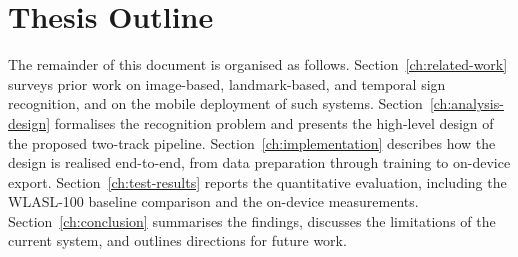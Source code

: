 \section{Thesis Outline}
\label{sec:intro-outline}

The remainder of this document is organised as follows.
Section~\ref{ch:related-work} surveys prior work on image-based,
landmark-based, and temporal sign recognition, and on the mobile
deployment of such systems.
Section~\ref{ch:analysis-design} formalises the recognition problem
and presents the high-level design of the proposed two-track
pipeline.
Section~\ref{ch:implementation} describes how the design is realised
end-to-end, from data preparation through training to on-device
export. Section~\ref{ch:test-results} reports the quantitative
evaluation, including the WLASL-100 baseline comparison and the
on-device measurements. Section~\ref{ch:conclusion} summarises the
findings, discusses the limitations of the current system, and
outlines directions for future work.
